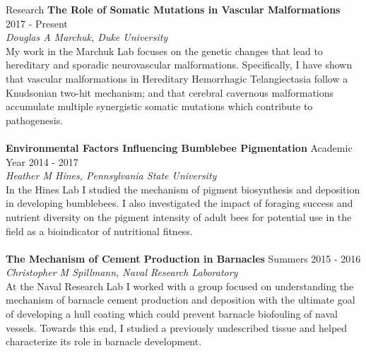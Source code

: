 \documentclass{resume} %
\begin{document}
\begin{rSection}{Research}
{\bf The Role of Somatic Mutations in Vascular Malformations} \hfill {2017 - Present} \\
\textit{Douglas A Marchuk, Duke University} \\
My work in the Marchuk Lab focuses on the genetic changes that lead to
hereditary and sporadic neurovascular malformations. Specifically, I have shown
that vascular malformations in Hereditary Hemorrhagic Telangiectasia follow a Knudsonian
two-hit mechanism; and that cerebral cavernous malformations accumulate multiple synergistic somatic
mutations which contribute to pathogenesis.  \\\\
{\bf Environmental Factors Influencing Bumblebee Pigmentation} \hfill {Academic Year 2014 - 2017} \\
\textit{Heather M Hines, Pennsylvania State University} \\
In the Hines Lab I studied the mechanism of pigment biosynthesis and deposition in developing bumblebees.
I also investigated the impact of foraging success and nutrient diversity on the pigment intensity of adult bees
for potential use in the field as a bioindicator of nutritional fitness. \\\\
{\bf The Mechanism of Cement Production in Barnacles} \hfill {Summers 2015 - 2016} \\
\textit{Christopher M Spillmann, Naval Research Laboratory} \\
At the Naval Research Lab I worked with a group focused on understanding the mechanism of
barnacle cement production and deposition with the ultimate goal of developing a hull coating which 
could prevent barnacle biofouling of naval vessels. Towards this end, I studied a previously
undescribed tissue and helped characterize its role in barnacle development. \\
\end{rSection}
\end{document}
